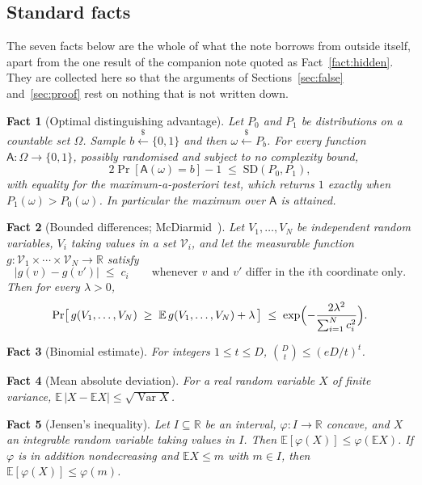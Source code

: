\documentclass{conjura-solution}
\renewcommand{\sample}{\stackrel{{\scriptscriptstyle\$}}{\leftarrow}}
\newcommand{\SD}{\mathrm{SD}}
\theoremstyle{cjplain}
\newtheorem{fact}{Fact}
\begin{document}
\subsection{Standard facts}\label{sec:facts}

The seven facts below are the whole of what the note borrows from outside itself, apart from the
one result of the companion note quoted as Fact~\ref{fact:hidden}. They are collected here so
that the arguments of Sections~\ref{sec:false} and~\ref{sec:proof} rest on nothing that is not
written down.

\begin{fact}[Optimal distinguishing advantage]\label{fact:sd}
Let $P_0$ and $P_1$ be distributions on a countable set $\Omega$. Sample $b \sample \{0,1\}$ and
then $\omega \sample P_b$. For every function $\mathsf{A} \colon \Omega \to \{0,1\}$, possibly
randomised and subject to no complexity bound,
\[
  2\Pr[\mathsf{A}(\omega) = b] - 1 \;\le\; \SD(P_0,P_1) ,
\]
with equality for the maximum-a-posteriori test, which returns $1$ exactly when
$P_1(\omega) > P_0(\omega)$. In particular the maximum over $\mathsf{A}$ is attained.
\end{fact}

\begin{fact}[Bounded differences; McDiarmid~\cite{McD89}]\label{fact:mcd}
Let $V_1, \dots, V_N$ be independent random variables, $V_i$ taking values in a set
$\mathcal{V}_i$, and let the measurable function
$g \colon \mathcal{V}_1 \times \cdots \times \mathcal{V}_N \to \mathbb{R}$ satisfy
\[
  |g(v) - g(v')| \;\le\; c_i
  \qquad\text{whenever $v$ and $v'$ differ in the $i$th coordinate only.}
\]
Then for every $\lambda > 0$,
\[
  \Pr\bigl[\, g(V_1,\dots,V_N) \;\ge\; \mathbb{E}\,g(V_1,\dots,V_N) + \lambda \,\bigr]
  \;\le\; \exp\Bigl(-\frac{2\lambda^{2}}{\sum_{i=1}^{N} c_i^{2}}\Bigr) .
\]
\end{fact}

\begin{fact}[Binomial estimate]\label{fact:binom}
For integers $1 \le t \le D$, \; $\binom{D}{t} \le (eD/t)^{t}$.
\end{fact}

\begin{fact}[Mean absolute deviation]\label{fact:mad}
For a real random variable $X$ of finite variance,
$\mathbb{E}\,|X - \mathbb{E}X| \le \sqrt{\operatorname{Var} X}$.
\end{fact}

\begin{fact}[Jensen's inequality]\label{fact:jensen}
Let $I \subseteq \mathbb{R}$ be an interval, $\varphi \colon I \to \mathbb{R}$ concave, and $X$
an integrable random variable taking values in $I$. Then
$\mathbb{E}[\varphi(X)] \le \varphi(\mathbb{E}X)$. If $\varphi$ is in addition nondecreasing and
$\mathbb{E}X \le m$ with $m \in I$, then $\mathbb{E}[\varphi(X)] \le \varphi(m)$.
\end{fact}
\end{document}
